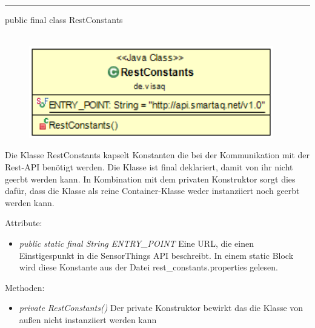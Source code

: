 \rule{\textwidth}{0.4pt}
public final class RestConstants
\\\\
\begin{minipage}{0.4\textwidth}
    \begin{figure}[H]
        {\centering\includegraphics[width=0.95\textwidth]{media/backend/modell/classes/RestConstants.png}}
    \end{figure}
    \end{minipage} \hfill
\begin{minipage}{0.6\textwidth}
    Die Klasse RestConstants kapselt Konstanten die bei der Kommunikation mit der Rest-API benötigt werden.
    Die Klasse ist final deklariert, damit von ihr nicht geerbt werden kann.
    In Kombination mit dem privaten Konstruktor sorgt dies dafür, dass die Klasse als reine Container-Klasse weder instanziiert noch geerbt werden kann.
\end{minipage}

Attribute:
\begin{itemize}
    \item \emph{public static final String ENTRY\_POINT} Eine URL, die einen Einstigespunkt in die \gls{SensorThings API} beschreibt.
    In einem static Block wird diese Konstante aus der Datei rest\_constants.properties gelesen.
\end{itemize}
Methoden:
\begin{itemize}
    \item \emph{private RestConstants()}
    Der private Konstruktor bewirkt das die Klasse von außen nicht instanziiert werden kann
\end{itemize}

